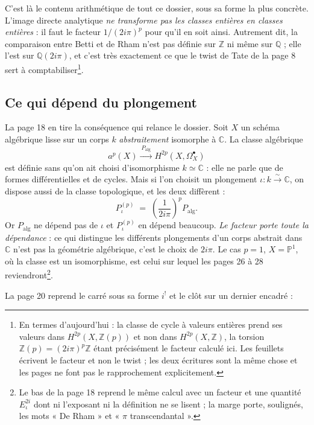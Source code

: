\documentclass[11pt,a4paper]{article}
\begin{document}
C'est là le contenu arithmétique de tout ce dossier, sous sa forme la plus
concrète. L'image directe analytique \emph{ne transforme pas les classes
entières en classes entières} : il faut le facteur $1/(2i\pi)^{p}$ pour qu'il en
soit ainsi. Autrement dit, la comparaison entre Betti et de Rham n'est pas
définie sur $\mathbb{Z}$ ni même sur $\mathbb{Q}$ ; elle l'est sur
$\mathbb{Q}(2i\pi)$, et c'est très exactement ce que le twist de Tate de la
page 8 sert à comptabiliser\footnote{En termes d'aujourd'hui : la classe de
cycle à valeurs entières prend ses valeurs dans $H^{2p}(X, \mathbb{Z}(p))$ et
non dans $H^{2p}(X, \mathbb{Z})$, la torsion $\mathbb{Z}(p) = (2i\pi)^{p}
\mathbb{Z}$ étant précisément le facteur calculé ici. Les feuillets écrivent le
facteur et non le twist ; les deux écritures sont la même chose et les pages ne
font pas le rapprochement explicitement.}.

\subsection*{Ce qui dépend du plongement}

La page 18 en tire la conséquence qui relance le dossier. Soit $X$ un schéma
algébrique lisse sur un corps $k$ \emph{abstraitement} isomorphe à $\mathbb{C}$.
La classe algébrique
\[
  a^{p}(X) \xrightarrow{\ P_{\mathrm{alg}}\ } H^{2p}(X, \Omega^{\bullet}_{X})
\]
est définie sans qu'on ait choisi d'isomorphisme $k \simeq \mathbb{C}$ : elle ne
parle que de formes différentielles et de cycles. Mais si l'on choisit un
plongement $\iota \colon k \xrightarrow{\ \sim\ } \mathbb{C}$, on dispose aussi
de la classe topologique, et les deux diffèrent :
\[
  P_{\iota}^{(p)} \;=\; \left(\frac{1}{2i\pi}\right)^{p} P_{\mathrm{alg}} .
\]
Or $P_{\mathrm{alg}}$ ne dépend pas de $\iota$ et $P_{\iota}^{(p)}$ en dépend
beaucoup. \emph{Le facteur porte toute la dépendance} : ce qui distingue les
différents plongements d'un corps abstrait dans $\mathbb{C}$ n'est pas la
géométrie algébrique, c'est le choix de $2i\pi$. Le cas $p = 1$,
$X = \mathbb{P}^{1}$, où la classe est un isomorphisme, est celui sur lequel les
pages 26 à 28 reviendront\footnote{Le bas de la page 18 reprend le même calcul
avec un facteur et une quantité $E_{\iota}^{2i}$ dont ni l'exposant ni la
définition ne se lisent ; la marge porte, soulignés, les mots « De Rham » et
« $\pi$ transcendantal ».}.

La page 20 reprend le carré sous sa forme $i^{!}$ et le clôt sur un dernier
encadré :

\end{document}
